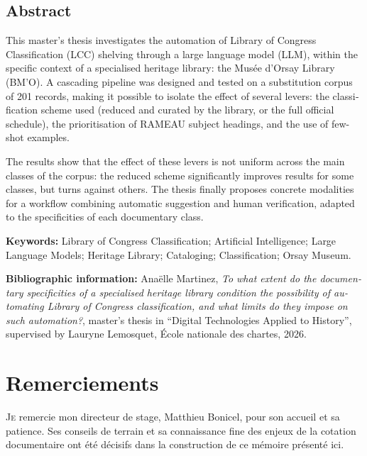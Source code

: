 \documentclass[12pt,twoside]{book}
\begin{document}
    \clearpage
    \begin{otherlanguage}{english}
\section*{Abstract}

This master's thesis investigates the automation of Library of Congress
Classification (LCC) shelving through a large language model (LLM), within
the specific context of a specialised heritage library: the Musée d'Orsay
Library (BM'O). A cascading pipeline was designed and tested on a
substitution corpus of 201 records, making it possible to isolate the
effect of several levers: the classification scheme used (reduced and
curated by the library, or the full official schedule), the prioritisation
of RAMEAU subject headings, and the use of few-shot examples.

The results show that the effect of these levers is not uniform across the
main classes of the corpus: the reduced scheme significantly improves
results for some classes, but turns against others. The thesis finally proposes concrete
modalities for a workflow combining automatic suggestion and human
verification, adapted to the specificities of each documentary class.

\vspace{0.5em}
\noindent\textbf{Keywords:} Library of Congress Classification; Artificial
Intelligence; Large Language Models; Heritage Library; Cataloging; Classification; Orsay Museum.

\vspace{0.5em}
\noindent\textbf{Bibliographic information:} Anaëlle Martinez, \emph{To what
extent do the documentary specificities of a specialised heritage library
condition the possibility of automating Library of Congress classification,
and what limits do they impose on such automation?}, master's thesis in
``Digital Technologies Applied to History'', supervised by Lauryne Lemosquet, École nationale des chartes, 2026.
\end{otherlanguage}
		\newpage{\pagestyle{empty}\cleardoublepage}
	
	\chapter{Remerciements}
	
\lettrine{J}e remercie mon directeur de stage,  Matthieu Bonicel, pour son accueil et sa patience. Ses conseils de terrain et sa connaissance fine des enjeux de la cotation documentaire ont été décisifs dans la construction de ce mémoire présenté ici.\newline
\end{document}
